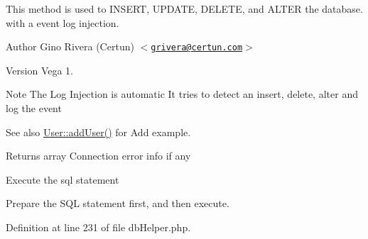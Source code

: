 \-This method is used to \-I\-N\-S\-E\-R\-T, \-U\-P\-D\-A\-T\-E, \-D\-E\-L\-E\-T\-E, and \-A\-L\-T\-E\-R the database. with a event log injection.

\begin{DoxyAuthor}{\-Author}
\-Gino \-Rivera (\-Certun) $<$\href{mailto:grivera@certun.com}{\tt grivera@certun.\-com}$>$ 
\end{DoxyAuthor}
\begin{DoxyVersion}{\-Version}
\-Vega 1.
\end{DoxyVersion}
\begin{DoxyNote}{\-Note}
\-The \-Log \-Injection is automatic \-It tries to detect an insert, delete, alter and log the event
\end{DoxyNote}
\begin{DoxySeeAlso}{\-See also}
\hyperlink{class_user_a8dfbe73a90ecf4cdec6b3229da0ee2f8}{\-User\-::add\-User()} for \-Add example.
\end{DoxySeeAlso}
\begin{DoxyReturn}{\-Returns}
array \-Connection error info if any 
\end{DoxyReturn}
\-Execute the sql statement

\-Prepare the \-S\-Q\-L statement first, and then execute.

\-Definition at line 231 of file db\-Helper.\-php.


